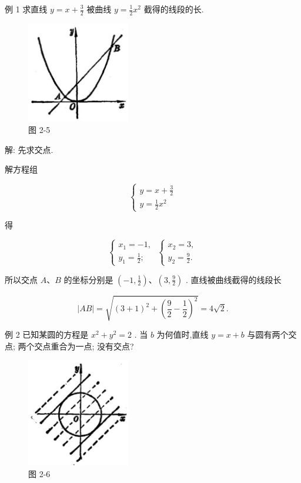\documentclass[lang=cn,newtx,10pt,scheme=chinese]{elegantbook}
\begin{document}
例 1 求直线 \(y = x + \frac{3}{2}\) 被曲线 \(y = \frac{1}{2}{x}^{2}\) 截得的线段的长.

\begin{figure}[h]
  \centering
  \includegraphics[max width=0.4\textwidth]{images/01912cc2-ffb6-728e-9ae7-b113ff05c64b_74_639219.jpg}
  \caption{图 2-5}
\end{figure}



解: 先求交点.

解方程组

\[
  \left\{ \begin{array}{l} y = x + \frac{3}{2} \\ y = \frac{1}{2}{x}^{2} \end{array}\right.
\]

得

\[
  \left\{ {\begin{array}{l} {x}_{1} = - 1, \\ {y}_{1} = \frac{1}{2}; \end{array}\;\left\{ \begin{array}{l} {x}_{2} = 3, \\ {y}_{2} = \frac{9}{2}. \end{array}\right. }\right.
\]

所以交点 \(A\text{、}B\) 的坐标分别是 \(\left( {-1,\frac{1}{2}}\right) \text{、}\left( {3,\frac{9}{2}}\right)\) . 直线被曲线截得的线段长

\[
  \left| {AB}\right| = \sqrt{{\left( 3 + 1\right) }^{2} + {\left( \frac{9}{2} - \frac{1}{2}\right) }^{2}} = 4\sqrt{2}.
\]

例 2 已知某圆的方程是 \({x}^{2} + {y}^{2} = 2\) . 当 \(b\) 为何值时,直线 \(y = x + b\) 与圆有两个交点; 两个交点重合为一点; 没有交点?

\begin{figure}[h]
  \centering
  \includegraphics[max width=0.4\textwidth]{images/01912cc2-ffb6-728e-9ae7-b113ff05c64b_75_443692.jpg}
  \caption{图 2-6}
\end{figure}
\end{document}
